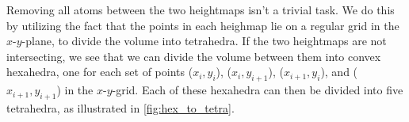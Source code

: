 Removing all atoms between the two heightmaps isn't a trivial task. We do this by utilizing the fact that the points in each heighmap lie on a regular grid in the $x$-$y$-plane, to divide the volume into tetrahedra. If the two heightmaps are not intersecting, we see that we can divide the volume between them into convex hexahedra, one for each set of points
($x_{i}, y_{i}$), ($x_{i}, y_{i+1}$), ($x_{i+1}, y_{i}$), and ($x_{i+1}, y_{i+1}$) 
in the $x$-$y$-grid. Each of these hexahedra can then be divided into five tetrahedra, as illustrated in \cref{fig:hex_to_tetra}.

% 

